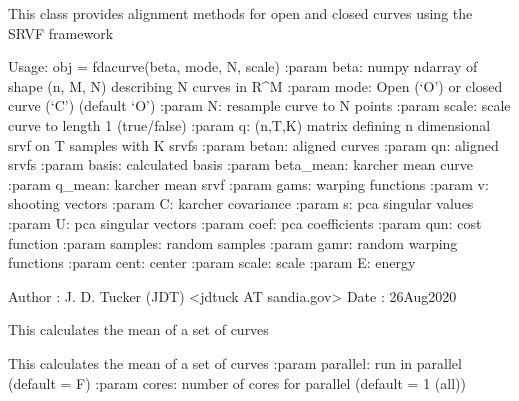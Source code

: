 \documentclass[letterpaper,10pt,english]{sphinxmanual}
\begin{document}
\begin{fulllineitems}
\label{\detokenize{curve_statistics:curve_stats.fdacurve}}
This class provides alignment methods for open and closed curves using the SRVF framework

Usage: obj = fdacurve(beta, mode, N, scale)
:param beta: numpy ndarray of shape (n, M, N) describing N curves
in R\textasciicircum{}M
:param mode: Open (‘O’) or closed curve (‘C’) (default ‘O’)
:param N: resample curve to N points
:param scale: scale curve to length 1 (true/false)
:param q:        (n,T,K) matrix defining n dimensional srvf on T samples with K srvfs
:param betan:     aligned curves
:param qn:        aligned srvfs
:param basis:     calculated basis
:param beta\_mean: karcher mean curve
:param q\_mean:    karcher mean srvf
:param gams:      warping functions
:param v:         shooting vectors
:param C:         karcher covariance
:param s:         pca singular values
:param U:         pca singular vectors
:param coef:      pca coefficients
:param qun:       cost function
:param samples:   random samples
:param gamr:      random warping functions
:param cent:      center
:param scale:     scale
:param E:         energy

Author :  J. D. Tucker (JDT) \textless{}jdtuck AT sandia.gov\textgreater{}
Date   :  26\sphinxhyphen{}Aug\sphinxhyphen{}2020

\begin{fulllineitems}
\label{\detokenize{curve_statistics:curve_stats.fdacurve.karcher_cov}}
This calculates the mean of a set of curves

\end{fulllineitems}


\begin{fulllineitems}
\label{\detokenize{curve_statistics:curve_stats.fdacurve.karcher_mean}}
This calculates the mean of a set of curves
:param parallel: run in parallel (default = F)
:param cores: number of cores for parallel (default = \sphinxhyphen{}1 (all))


\end{fulllineitems}
\end{fulllineitems}
\end{document}
